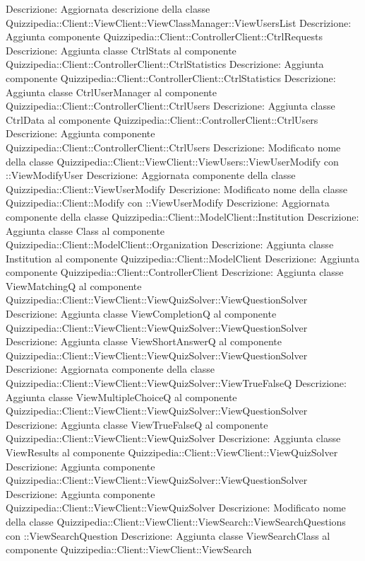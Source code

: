 Descrizione: Aggiornata descrizione della classe Quizzipedia::Client::ViewClient::ViewClassManager::ViewUsersList 
Descrizione: Aggiunta componente Quizzipedia::Client::ControllerClient::CtrlRequests 
Descrizione: Aggiunta classe CtrlStats al componente Quizzipedia::Client::ControllerClient::CtrlStatistics 
Descrizione: Aggiunta componente Quizzipedia::Client::ControllerClient::CtrlStatistics 
Descrizione: Aggiunta classe CtrlUserManager al componente Quizzipedia::Client::ControllerClient::CtrlUsers 
Descrizione: Aggiunta classe CtrlData al componente Quizzipedia::Client::ControllerClient::CtrlUsers 
Descrizione: Aggiunta componente Quizzipedia::Client::ControllerClient::CtrlUsers 
Descrizione: Modificato nome della classe Quizzipedia::Client::ViewClient::ViewUsers::ViewUserModify con ::ViewModifyUser 
Descrizione: Aggiornata componente della classe Quizzipedia::Client::ViewUserModify 
Descrizione: Modificato nome della classe Quizzipedia::Client::Modify con ::ViewUserModify 
Descrizione: Aggiornata componente della classe Quizzipedia::Client::ModelClient::Institution 
Descrizione: Aggiunta classe Class al componente Quizzipedia::Client::ModelClient::Organization 
Descrizione: Aggiunta classe Institution al componente Quizzipedia::Client::ModelClient 
Descrizione: Aggiunta componente Quizzipedia::Client::ControllerClient 
Descrizione: Aggiunta classe ViewMatchingQ al componente Quizzipedia::Client::ViewClient::ViewQuizSolver::ViewQuestionSolver 
Descrizione: Aggiunta classe ViewCompletionQ al componente Quizzipedia::Client::ViewClient::ViewQuizSolver::ViewQuestionSolver 
Descrizione: Aggiunta classe ViewShortAnswerQ al componente Quizzipedia::Client::ViewClient::ViewQuizSolver::ViewQuestionSolver 
Descrizione: Aggiornata componente della classe Quizzipedia::Client::ViewClient::ViewQuizSolver::ViewTrueFalseQ 
Descrizione: Aggiunta classe ViewMultipleChoiceQ al componente Quizzipedia::Client::ViewClient::ViewQuizSolver::ViewQuestionSolver 
Descrizione: Aggiunta classe ViewTrueFalseQ al componente Quizzipedia::Client::ViewClient::ViewQuizSolver 
Descrizione: Aggiunta classe ViewResults al componente Quizzipedia::Client::ViewClient::ViewQuizSolver 
Descrizione: Aggiunta componente Quizzipedia::Client::ViewClient::ViewQuizSolver::ViewQuestionSolver 
Descrizione: Aggiunta componente Quizzipedia::Client::ViewClient::ViewQuizSolver 
Descrizione: Modificato nome della classe Quizzipedia::Client::ViewClient::ViewSearch::ViewSearchQuestions con ::ViewSearchQuestion 
Descrizione: Aggiunta classe ViewSearchClass al componente Quizzipedia::Client::ViewClient::ViewSearch 
